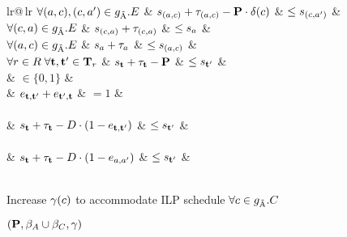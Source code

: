 \begin{algorithm}[htb]
{{\begin{tabular}{lr@{\,}lr}
          $\forall (a, c), (c, a') \in g_{\tilde{\textrm{A}}}.E$ & $s_{(a,c)} + \tau_{(a,c)} - \mathbf{P}\cdot\delta(c)$ & $\leq s_{(c,a')}$ & \\
          $\forall (c,a) \in g_{\tilde{\textrm{A}}}.E$                       & $s_{(c,a)} + \tau_{(c,a)}$ & $\leq s_a$   & \\
          $\forall (a,c) \in g_{\tilde{\textrm{A}}}.E$                       & $s_a + \tau_a$                           & $\leq s_{(a,c)}$                                 & \\
          $\forall r \in R\;\forall \mathbf{t}, \mathbf{t}' \in \mathbf{T}_r$ & $s_{\mathbf{t}} + \tau_{\mathbf{t}} - \mathbf{P}$          & $\leq s_{\mathbf{t}'}$ & \\
                                                            & $\in \{0, 1\}$                              & \\
          & $e_{\mathbf{t},\mathbf{t}'} + e_{\mathbf{t}',\mathbf{t}}$ & $= 1$                                       & \\
        \\
          & $s_{\mathbf{t}} + \tau_{\mathbf{t}} - D\cdot(1-e_{\mathbf{t},\mathbf{t}'})$                & $\leq s_{\mathbf{t}'}$ & \\
        \\
          & $s_{\mathbf{t}} + \tau_{\mathbf{t}} - D\cdot(1-e_{a,a'})$              & $\leq s_{\mathbf{t}'}$ & 
        \end{tabular}\nl\\
      Increase $\gamma(c)$ to accommodate \ac{ILP} schedule \quad$\forall c \in g_{\tilde{\textrm{A}}}.C$ \label{ln:ilp-increase-channel-capacities}\\
    }
    \Return $(\mathbf{P}, \beta_A \cup \beta_C, \gamma)$
  }
\end{algorithm}
